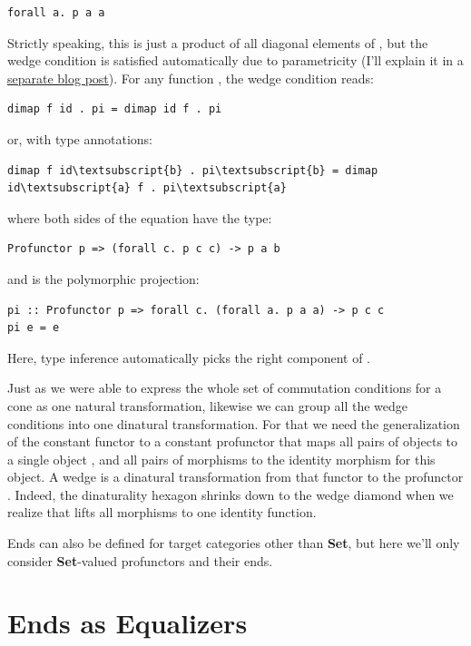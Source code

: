 \begin{verbatim}
forall a. p a a
\end{verbatim}
Strictly speaking, this is just a product of all diagonal elements of
, but the wedge condition is satisfied automatically due to
parametricity (I'll explain it in a
\href{https://bartoszmilewski.com/2017/04/11/profunctor-parametricity/}{separate
blog post}). For any function , the
wedge condition reads:

\begin{verbatim}
dimap f id . pi = dimap id f . pi
\end{verbatim}
or, with type annotations:

\begin{Verbatim}[commandchars=\\\{\}]
dimap f id\textsubscript{b} . pi\textsubscript{b} = dimap id\textsubscript{a} f . pi\textsubscript{a}
\end{Verbatim}
where both sides of the equation have the type:

\begin{verbatim}
Profunctor p => (forall c. p c c) -> p a b
\end{verbatim}
and  is the polymorphic projection:

\begin{verbatim}
pi :: Profunctor p => forall c. (forall a. p a a) -> p c c
pi e = e
\end{verbatim}
Here, type inference automatically picks the right component of
.

Just as we were able to express the whole set of commutation conditions
for a cone as one natural transformation, likewise we can group all the
wedge conditions into one dinatural transformation. For that we need the
generalization of the constant functor  to a constant
profunctor that maps all pairs of objects to a single object ,
and all pairs of morphisms to the identity morphism for this object. A
wedge is a dinatural transformation from that functor to the profunctor
. Indeed, the dinaturality hexagon shrinks down to the wedge
diamond when we realize that  lifts all morphisms to one
identity function.

Ends can also be defined for target categories other than \textbf{Set},
but here we'll only consider \textbf{Set}-valued profunctors and their
ends.

\section{Ends as Equalizers}\label{ends-as-equalizers}

